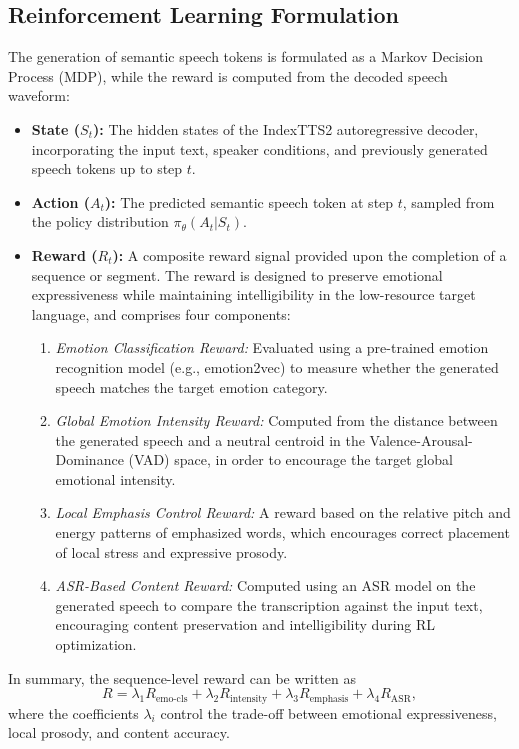 \subsection{Reinforcement Learning Formulation}
The generation of semantic speech tokens is formulated as a Markov Decision Process (MDP), while the reward is computed from the decoded speech waveform:
\begin{itemize}
    \item \textbf{State ($S_t$):} The hidden states of the IndexTTS2 autoregressive decoder, incorporating the input text, speaker conditions, and previously generated speech tokens up to step $t$.
    \item \textbf{Action ($A_t$):} The predicted semantic speech token at step $t$, sampled from the policy distribution $\pi_\theta(A_t|S_t)$.
    \item \textbf{Reward ($R_t$):} A composite reward signal provided upon the completion of a sequence or segment. The reward is designed to preserve emotional expressiveness while maintaining intelligibility in the low-resource target language, and comprises four components:
    \begin{enumerate}
        \item \textit{Emotion Classification Reward:} Evaluated using a pre-trained emotion recognition model (e.g., emotion2vec) to measure whether the generated speech matches the target emotion category.
        \item \textit{Global Emotion Intensity Reward:} Computed from the distance between the generated speech and a neutral centroid in the Valence-Arousal-Dominance (VAD) space, in order to encourage the target global emotional intensity.
        \item \textit{Local Emphasis Control Reward:} A reward based on the relative pitch and energy patterns of emphasized words, which encourages correct placement of local stress and expressive prosody.
        \item \textit{ASR-Based Content Reward:} Computed using an ASR model on the generated speech to compare the transcription against the input text, encouraging content preservation and intelligibility during RL optimization.
    \end{enumerate}
\end{itemize}
In summary, the sequence-level reward can be written as
\[
R = \lambda_1 R_{\text{emo-cls}} + \lambda_2 R_{\text{intensity}} + \lambda_3 R_{\text{emphasis}} + \lambda_4 R_{\text{ASR}},
\]
where the coefficients $\lambda_i$ control the trade-off between emotional expressiveness, local prosody, and content accuracy.

